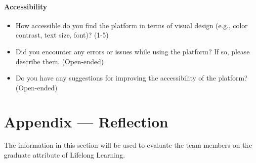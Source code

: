 \documentclass[12pt, titlepage]{article}
\begin{document}
\paragraph{Accessibility}
\begin{itemize}
\item{How accessible do you find the platform in terms of visual design (e.g., color contrast, text size, font)? (1-5)}
\item{Did you encounter any errors or issues while using the platform? If so, please describe them. (Open-ended)}
\item{Do you have any suggestions for improving the accessibility of the platform?
(Open-ended)}
\end{itemize}

\newpage{}
\section*{Appendix --- Reflection}


The information in this section will be used to evaluate the team members on the
graduate attribute of Lifelong Learning.


\end{document}
